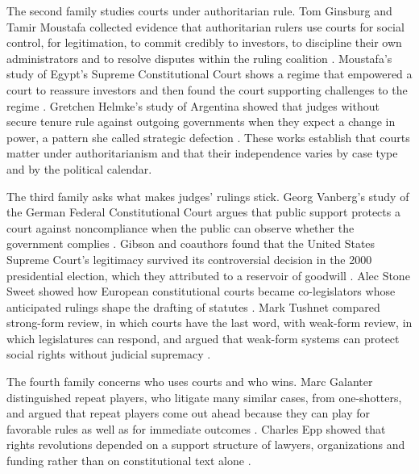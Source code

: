 \documentclass[11pt,letterpaper]{article}
\theoremstyle{definition}
\theoremstyle{remark}
\begin{document}
The second family studies courts under authoritarian rule. Tom Ginsburg and Tamir Moustafa collected evidence that authoritarian rulers use courts for social control, for legitimation, to commit credibly to investors, to discipline their own administrators and to resolve disputes within the ruling coalition \citep{ginsburg2008}. Moustafa's study of Egypt's Supreme Constitutional Court shows a regime that empowered a court to reassure investors and then found the court supporting challenges to the regime \citep{moustafa2007}. Gretchen Helmke's study of Argentina showed that judges without secure tenure rule against outgoing governments when they expect a change in power, a pattern she called strategic defection \citep{helmke2005}. These works establish that courts matter under authoritarianism and that their independence varies by case type and by the political calendar.

The third family asks what makes judges' rulings stick. Georg Vanberg's study of the German Federal Constitutional Court argues that public support protects a court against noncompliance when the public can observe whether the government complies \citep{vanberg2005}. Gibson and coauthors found that the United States Supreme Court's legitimacy survived its controversial decision in the 2000 presidential election, which they attributed to a reservoir of goodwill \citep{gibson2003}. Alec Stone Sweet showed how European constitutional courts became co-legislators whose anticipated rulings shape the drafting of statutes \citep{stonesweet2000}. Mark Tushnet compared strong-form review, in which courts have the last word, with weak-form review, in which legislatures can respond, and argued that weak-form systems can protect social rights without judicial supremacy \citep{tushnet2008}.

The fourth family concerns who uses courts and who wins. Marc Galanter distinguished repeat players, who litigate many similar cases, from one-shotters, and argued that repeat players come out ahead because they can play for favorable rules as well as for immediate outcomes \citep{galanter1974}. Charles Epp showed that rights revolutions depended on a support structure of lawyers, organizations and funding rather than on constitutional text alone \citep{epp1998}.
\end{document}
